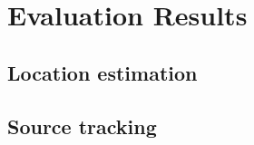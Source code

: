\chapter{Evaluation Results}
\label{chap:results}

\section{Location estimation}
\section{Source tracking}